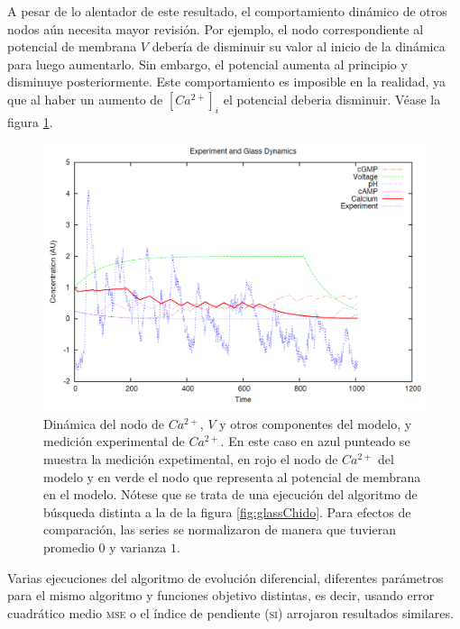 A pesar de lo alentador de este resultado, el comportamiento dinámico de otros nodos aún necesita mayor revisión. Por ejemplo, el nodo correspondiente al potencial de membrana $V$ debería de disminuir su valor al inicio de la dinámica para luego aumentarlo. Sin embargo, el potencial aumenta al principio y disminuye posteriormente. Este comportamiento es imposible en la realidad, ya que al haber un aumento de $[Ca^{2+}]_i$ el potencial deberia disminuir. Véase la figura \ref{fig:glassChafa}.

\begin{figure}[h]
\includegraphics[width=0.9\linewidth]{gfx/glassChafa}
\caption[Dinámica de $Ca^{2+}$, $V$ y otros componentes del modelo, y medición experimental de $Ca^{2+}$]{Dinámica del nodo de $Ca^{2+}$, $V$ y otros componentes del modelo, y medición experimental de $Ca^{2+}$. En este caso en azul punteado se muestra la medición expetimental, en rojo el nodo de $Ca^{2+}$ del modelo y en verde el nodo que representa al potencial de membrana en el modelo. Nótese que se trata de una ejecución del algoritmo de búsqueda distinta a la de la figura \ref{fig:glassChido}. Para efectos de comparación, las series se normalizaron de manera que tuvieran promedio $0$ y varianza $1$.}\label{fig:glassChafa}
\end{figure}

Varias ejecuciones del algoritmo de evolución diferencial, diferentes parámetros para el mismo algoritmo y funciones objetivo distintas, es decir, usando error cuadrático medio \textsc{mse} o el índice de pendiente \textsc{(si)} arrojaron resultados similares.












































